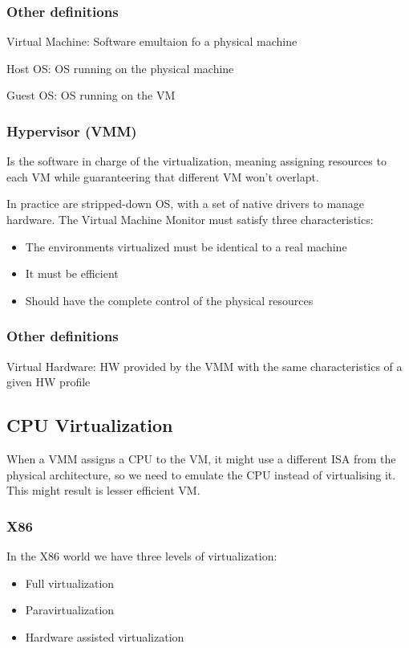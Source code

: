 \documentclass[12pt, a4paper]{article}
\begin{document}
\subsubsection{Other definitions}
Virtual Machine: Software emultaion fo a physical machine

Host OS: OS running on the physical machine

Guest OS: OS running on the VM

\subsubsection{Hypervisor (VMM)}
Is the software in charge of the virtualization, meaning assigning resources to each VM while guaranteering that
different VM won't overlapt.

In practice are stripped-down OS, with a set of native drivers to manage hardware. The Virtual Machine Monitor
must satisfy three characteristics:
\begin{itemize}
    \item The environments virtualized must be identical to a real machine
    \item It must be efficient
    \item Should have the complete control of the physical resources
\end{itemize}

\subsubsection{Other definitions}

Virtual Hardware: HW provided by the VMM with the same characteristics of a given HW profile



\subsection{CPU Virtualization}
When a VMM assigns a CPU to the VM, it might use a different ISA from the physical architecture, so we need to 
emulate the CPU instead of virtualising it. This might result is lesser efficient VM.

\subsubsection{X86}
In the X86 world we have three levels of virtualization:
\begin{itemize}
    \item Full virtualization
    \item Paravirtualization
    \item Hardware assisted virtualization
\end{itemize}
\end{document}
